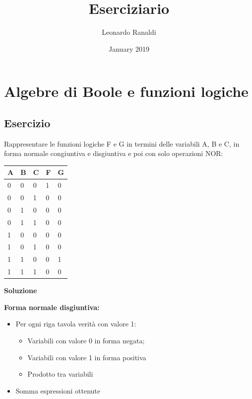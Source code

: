 \documentclass{article}
\title{Eserciziario}
\author{Leonardo Ranaldi }
\date{January 2019}
\begin{document}
\maketitle

\iffalse
\section{Algebre di Boole e funzioni logiche}

\subsection{Esercizio}
Rappresentare le funzioni logiche F e G in termini delle variabili A, B e C, in
forma normale congiuntiva e disgiuntiva e poi con solo operazioni NOR:

\vskip 0.3cm
\begin{tabular}{|p{}|p{}|p{}|p{}|p{}|}
\hline
A        & B              & C      & F      & G     \\
\hline
0            & 0             & 0      & 1    & 0  \\
0            & 0             & 1      & 0   & 0   \\
0            & 1             & 0      & 0    & 0  \\
0            & 1             & 1      & 0   & 0  \\
1            & 0             & 0      & 0    & 0  \\
1            & 0             & 1      & 0    & 0  \\
1            & 1             & 0      & 0    & 1  \\
1            & 1             & 1      & 0   & 0   \\
\hline
\end{tabular}

\vskip 0.5cm
\textbf{Soluzione}
\vskip 0.5cm

\textbf{Forma normale disgiuntiva:}
\begin{itemize}
\item Per ogni riga tavola verità con valore 1:
\begin{itemize}
 \item Variabili con valore 0 in forma negata;
 \item Variabili con valore 1 in forma positiva
 \item Prodotto tra variabili
\end{itemize}
\item  Somma espressioni ottenute
\end{itemize}
\end{document}
